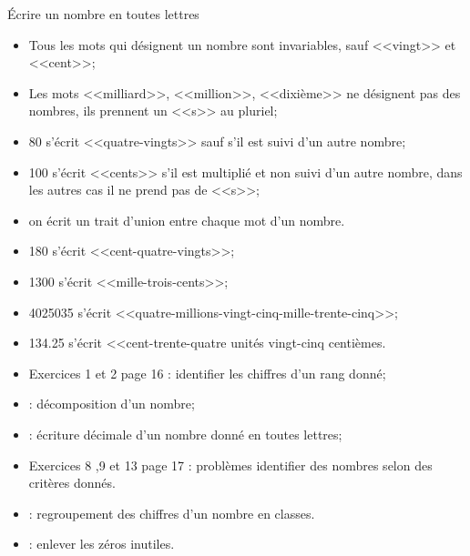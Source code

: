 \begin{mymethname}{\'Ecrire un nombre en toutes lettres}
	\begin{itemize}
		\item Tous les mots qui désignent un nombre sont invariables, sauf <<vingt>> et <<cent>>;
		\item Les mots <<milliard>>, <<million>>, <<dixième>> ne désignent pas des nombres, ils prennent un <<s>> au pluriel;
		\item 80 s'écrit <<quatre-vingts>> sauf s'il est suivi d'un autre nombre;
		\item 100 s'écrit <<cents>> s'il est multiplié et non suivi d'un autre nombre, dans les autres cas il ne prend pas de <<s>>;
		\item on écrit un trait d'union entre chaque mot d'un nombre.
	\end{itemize}
\end{mymethname}

\begin{myexs}
	\begin{itemize}
		\item 180 s'écrit \pause <<cent-quatre-vingts>>;\pause
		\item \num{1300} s'écrit \pause <<mille-trois-cents>>;\pause
		\item \num{4025035} s'écrit \pause <<quatre-millions-vingt-cinq-mille-trente-cinq>>;
		\item \num{134.25} s'écrit \pause <<cent-trente-quatre unités vingt-cinq centièmes.
	\end{itemize}
\end{myexs}

\begin{myexos}
	\begin{itemize}
		\item Exercices 1 et 2 page 16 : identifier les chiffres d'un rang donné;
		\item {} : décomposition d'un nombre;
		\item {} : \'ecriture décimale d'un nombre donné en toutes lettres;
		\item Exercices 8 ,9 et 13 page 17 : problèmes identifier des nombres selon des critères donnés.
		\item {} : regroupement des chiffres d'un nombre en classes.
		\item {} : enlever les zéros inutiles.
	\end{itemize}
	
\end{myexos}
